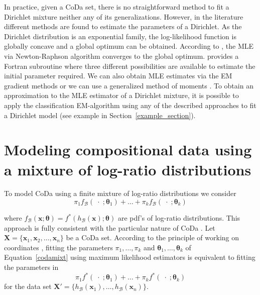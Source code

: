 \documentclass[12pt, a4paper]{article}
\newcommand{\m}[1]{\boldsymbol{#1}}
\begin{document}
In practice, given a CoDa set, there is no straightforward method to fit a Dirichlet mixture neither any of its generalizations. However, in the literature different methods are found to estimate the parameters of a Dirichlet. As the Dirichlet distribution is an exponential family, the log-likelihood function is globally concave and a global optimum can be obtained. According to \cite{ng2011dirichlet}, the MLE via Newton-Raphson algorithm converges to the global optimum. \cite{narayanan1991algorithm} provides a Fortran subroutine where three different possibilities are available to estimate the initial parameter required.
We can also obtain MLE estimates via the EM gradient methods \citep{ng2011dirichlet} or we can use a generalized method of moments
\citep{hansen1982large}.  
To obtain an approximation to the MLE estimator of a Dirichlet mixture, it is possible to apply the classification EM-algorithm \citep{celeux1992classification} using any of the described approaches to fit a Dirichlet model (see example in Section~\ref{example_section}).



\section{Modeling compositional data using a mixture of log-ratio distributions}
\label{codamix_section}

\noindent To model CoDa using a finite mixture of log-ratio distributions we consider 
\begin{equation}
\pi_1 f_\mathcal{B}(\;\cdot\; ; \m\theta_1) + \dots + \pi_k f_\mathcal{B}(\;\cdot\; ; \m\theta_k)
\label{codamixt}
\end{equation}

where $f_\mathcal{B}(\textbf{x} ; \m\theta) = f^*(h_\mathcal{B}(\textbf{x}) ; \m\theta)$ are pdf's of log-ratio distributions. This approach is fully consistent with the particular nature of CoDa \cite{aitchison1986statistical}.
Let $\mathbf{X} =  \{ \textbf{x}_1, \textbf{x}_2, \dots , \textbf{x}_n \}$ be a CoDa set. 
According to the principle of working on coordinates \citep{figueras2011principle}, fitting the parameters $\pi_1, \dots, \pi_k$ and $\m\theta_1, \dots, \m\theta_k$ of Equation~\ref{codamixt} using maximum likelihood estimators is equivalent to fitting the parameters in
\begin{equation}
\pi_1 f^*(\;\cdot\; ; \m\theta_1) + \dots + \pi_k f^*(\;\cdot\; ; \m\theta_k)
\label{coordmixt}
\end{equation}
for the data set $\mathbf{X}' = \{ h_\mathcal{B}(\mathbf{x}_1), \dots, h_\mathcal{B}(\mathbf{x}_n) \}$.
\end{document}
